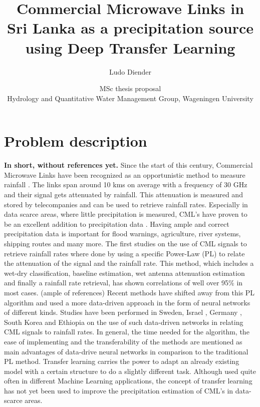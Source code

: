 \documentclass[twocolumn, 10pt, a4paper]{article}
\begin{document}
	
	\title{\vspace{-1cm}\Huge{Commercial Microwave Links in Sri Lanka as a precipitation source using Deep Transfer Learning}}
	\author{\Large{Ludo Diender}}
	\date{\normalsize{MSc thesis proposal\\
			Hydrology and Quantitative Water Management Group,
			Wageningen University}}
	
	\maketitle
	
	\section{Problem description}
	
	\textbf{In short, without references yet.}
	Since the start of this century, Commercial Microwave Links have been recognized as an opportunistic method to measure rainfall \cite{Leijnse2007}. The links span around 10 kms on average with a frequency of 30 GHz and their signal gets attenuated by rainfall. This attenuation is measured and stored by telecompanies and can be used to retrieve rainfall rates. Especially in data scarce areas, where little precipitation is measured, CML's have proven to be an excellent addition to precipitation data \cite{Overeem2021,Doumounia2014,Diba2021}. Having ample and correct precipitation data is important for flood warnings, agriculture, river systems, shipping routes and many more.
	The first studies on the use of CML signals to retrieve rainfall rates where done by using a specific Power-Law (PL) to relate the attenuation of the signal and the rainfall rate. This method, which includes a wet-dry classification, baseline estimation, wet antenna attenuation estimation and finally a rainfall rate retrieval, has shown correlations of well over 95\% in most cases. (ample of references) Recent methods have shifted away from this PL algorithm and used a more data-driven approach in the form of neural networks of different kinds. Studies have been performed in Sweden, Israel \cite{Habi2019}, Germany \cite{Polz2020}, South Korea and Ethiopia \cite{Diba2021} on the use of such data-driven networks in relating CML signals to rainfall rates. In general, the time needed for the algorithm, the ease of implementing and the transferability of the methods are mentioned as main advantages of data-drive neural networks in comparison to the traditional PL method. 
	Transfer learning carries the power to adapt an already existing model with a certain structure to do a slightly different task.   Although used quite often in different Machine Learning applications, the concept of transfer learning has not yet been used to improve the precipitation estimation of CML's in data-scarce areas.  
	
\end{document}
